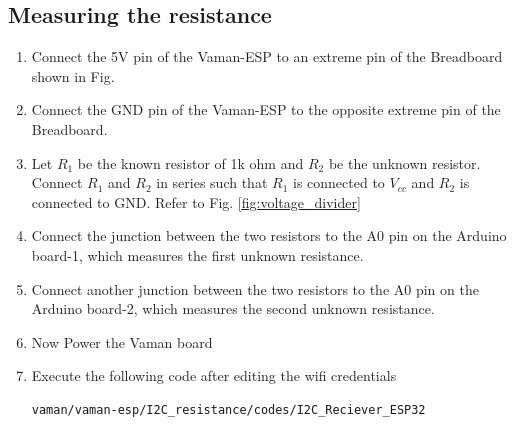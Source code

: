 \subsection{Measuring the resistance}
\begin{enumerate}[label=\thesection.\arabic*.,ref=\thesection.\theenumi]

\item
Connect the 5V pin of the Vaman-ESP to an extreme pin of the Breadboard shown in Fig. %
\item
Connect the GND pin of the Vaman-ESP to the opposite extreme pin of the Breadboard.

%
%
\item
Let $R_1$ be the known resistor of 1k ohm and $R_2$ be the unknown resistor. Connect $R_1$ and $R_2$ in series such that $R_1$ is connected
to $V_{cc}$ and $R_2$ is connected to GND. Refer to Fig. \ref{fig:voltage_divider} 
\item
Connect the junction between the two resistors to  the A0 pin on the Arduino board-1, which measures the first unknown resistance.
\item 
Connect another junction between the two resistors to  the A0 pin on the Arduino board-2, which measures the second unknown resistance.
\item
Now Power the Vaman board
\item
Execute the following code after editing the wifi credentials
\begin{lstlisting}
vaman/vaman-esp/I2C_resistance/codes/I2C_Reciever_ESP32
\end{lstlisting}
\end{enumerate}
